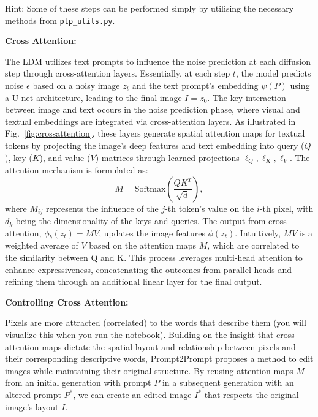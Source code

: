 \documentclass[11pt,addpoints,answers]{exam}
\begin{document}
\begin{questions}
\begin{itemize}
\end{itemize}

Hint: Some of these steps can be performed simply by utilising the necessary methods from \lstinline{ptp_utils.py}.


\textbf{Cross Attention:} 

The LDM utilizes text prompts to influence the noise prediction at each diffusion step through cross-attention layers. Essentially, at each step $t$, the model predicts noise $\epsilon$ based on a noisy image $z_t$ and the text prompt's embedding $\psi(P)$ using a U-net architecture, leading to the final image $I = z_0$. The key interaction between image and text occurs in the noise prediction phase, where visual and textual embeddings are integrated via cross-attention layers. As illustrated in Fig.~\ref{fig:crossattention}, these layers generate spatial attention maps for textual tokens by projecting the image's deep features and text embedding into query ($Q$), key ($K$), and value ($V$) matrices through learned projections $\ell_Q, \ell_K, \ell_V$. The attention mechanism is formulated as:
\begin{equation}
M = \text{Softmax} \left( \frac{QK^T}{\sqrt{d}} \right),
\end{equation}
where $M_{ij}$ represents the influence of the $j$-th token's value on the $i$-th pixel, with $d_k$ being the dimensionality of the keys and queries. The output from cross-attention, $\phi_b(z_t) = MV$, updates the image features $\phi(z_t)$. Intuitively, $MV$ is a weighted average of $V$ based on the attention maps $M$, which are correlated to the similarity between Q and K. This process leverages multi-head attention to enhance expressiveness, concatenating the outcomes from parallel heads and refining them through an additional linear layer for the final output.

\textbf{Controlling Cross Attention:} 

Pixels are more attracted (correlated) to the words that describe them (you will visualize this when you run the notebook).
Building on the insight that cross-attention maps dictate the spatial layout and relationship between pixels and their corresponding descriptive words, Prompt2Prompt proposes a method to edit images while maintaining their original structure. By reusing attention maps $M$ from an initial generation with prompt $P$ in a subsequent generation with an altered prompt $P^*$, we can create an edited image $I^*$ that respects the original image's layout $I$.


\end{questions}
\end{document}
